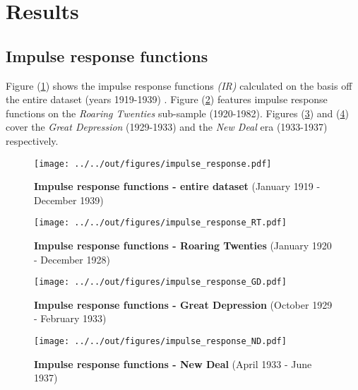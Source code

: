 \section{Results}
\subsection{Impulse response functions}
\label{s:ir}
Figure (\ref{irt}) shows the impulse response functions \textit{(IR)} calculated on the basis off the entire dataset (years 1919-1939) . Figure (\ref{irr}) features impulse response functions on the \textit{Roaring Twenties} sub-sample (1920-1982). Figures (\ref{irg}) and (\ref{irn}) cover the \textit{Great Depression} (1929-1933) and the \textit{New Deal} era (1933-1937) respectively.

\begin{figure}[ht]
  \footnotesize 
  \centering
  		\texttt{[image: ../../out/figures/impulse\_response.pdf]}
  \vspace{3mm}
  \caption[Impulse response functions - entire dataset]{\textbf{Impulse response functions - entire dataset} (January 1919 - December 1939)}
  \label{irt}
\end{figure}

\begin{figure}[ht]
  \footnotesize 
  \centering
  		\texttt{[image: ../../out/figures/impulse\_response\_RT.pdf]}
  \vspace{3mm}
  \caption[Impulse response functions - Roaring Twenties]{\textbf{Impulse response functions - Roaring Twenties} (January 1920 - December 1928)}
  \label{irr}
\end{figure}

\begin{figure}[ht]
  \footnotesize 
  \centering
  		\texttt{[image: ../../out/figures/impulse\_response\_GD.pdf]}
  \vspace{3mm}
  \caption[Impulse response functions - Great Depression]{\textbf{Impulse response functions - Great Depression} (October 1929 - February 1933)}
  \label{irg}
\end{figure}

\begin{figure}[ht]
  \footnotesize 
  \centering
  		\texttt{[image: ../../out/figures/impulse\_response\_ND.pdf]}
  \vspace{3mm}
  \caption[Impulse response functions - New Deal]{\textbf{Impulse response functions - New Deal} (April 1933 - June 1937)}
  \label{irn}
\end{figure}

